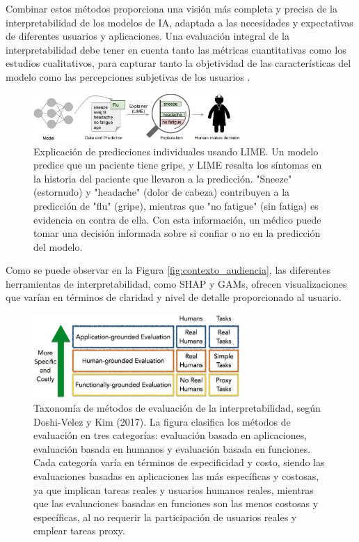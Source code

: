 Combinar estos métodos proporciona una visión más completa y precisa de la interpretabilidad de los modelos de IA, adaptada a las necesidades y expectativas de diferentes usuarios y aplicaciones. Una evaluación integral de la interpretabilidad debe tener en cuenta tanto las métricas cuantitativas como los estudios cualitativos, para capturar tanto la objetividad de las características del modelo como las percepciones subjetivas de los usuarios \cite{doshi2017towards, Kaur-2020}.

\begin{figure}[h!]
    \centering
    \includegraphics[width=0.7\textwidth]{include/lime.png} %
    \caption[Explicación de predicciones individuales usando LIME]{Explicación de predicciones individuales usando LIME. Un modelo predice que un paciente tiene gripe, y LIME resalta los síntomas en la historia del paciente que llevaron a la predicción. "Sneeze" (estornudo) y "headache" (dolor de cabeza) contribuyen a la predicción de "flu" (gripe), mientras que "no fatigue" (sin fatiga) es evidencia en contra de ella. Con esta información, un médico puede tomar una decisión informada sobre si confiar o no en la predicción del modelo.}
    \label{fig:LIME}
\end{figure}

Como se puede observar en la Figura \ref{fig:contexto_audiencia}, las diferentes herramientas de interpretabilidad, como SHAP y GAMs, ofrecen visualizaciones que varían en términos de claridad y nivel de detalle proporcionado al usuario.

\begin{figure}[h!]
    \centering
    \includegraphics[width=0.7\textwidth]{include/taxonomia.PNG} %
    \caption[Taxonomía de Métodos de Evaluación de Interpretabilidad]{Taxonomía de métodos de evaluación de la interpretabilidad, según Doshi-Velez y Kim (2017). La figura clasifica los métodos de evaluación en tres categorías: evaluación basada en aplicaciones, evaluación basada en humanos y evaluación basada en funciones. Cada categoría varía en términos de especificidad y costo, siendo las evaluaciones basadas en aplicaciones las más específicas y costosas, ya que implican tareas reales y usuarios humanos reales, mientras que las evaluaciones basadas en funciones son las menos costosas y específicas, al no requerir la participación de usuarios reales y emplear tareas proxy.}
    \label{fig:taxonomy_interpretability}
\end{figure}

